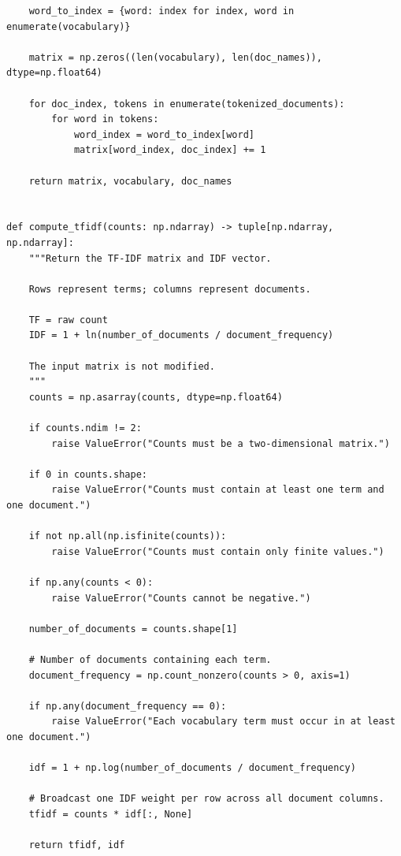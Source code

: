 \documentclass[12pt,a4paper]{report}
\theoremstyle{plain}
\theoremstyle{definition}
\theoremstyle{remark}
\theoremstyle{definition}
\begin{document}
\begin{lstlisting}
    word_to_index = {word: index for index, word in enumerate(vocabulary)}

    matrix = np.zeros((len(vocabulary), len(doc_names)), dtype=np.float64)

    for doc_index, tokens in enumerate(tokenized_documents):
        for word in tokens:
            word_index = word_to_index[word]
            matrix[word_index, doc_index] += 1

    return matrix, vocabulary, doc_names


def compute_tfidf(counts: np.ndarray) -> tuple[np.ndarray, np.ndarray]:
    """Return the TF-IDF matrix and IDF vector.

    Rows represent terms; columns represent documents.

    TF = raw count
    IDF = 1 + ln(number_of_documents / document_frequency)

    The input matrix is not modified.
    """
    counts = np.asarray(counts, dtype=np.float64)

    if counts.ndim != 2:
        raise ValueError("Counts must be a two-dimensional matrix.")

    if 0 in counts.shape:
        raise ValueError("Counts must contain at least one term and one document.")

    if not np.all(np.isfinite(counts)):
        raise ValueError("Counts must contain only finite values.")

    if np.any(counts < 0):
        raise ValueError("Counts cannot be negative.")

    number_of_documents = counts.shape[1]

    # Number of documents containing each term.
    document_frequency = np.count_nonzero(counts > 0, axis=1)

    if np.any(document_frequency == 0):
        raise ValueError("Each vocabulary term must occur in at least one document.")

    idf = 1 + np.log(number_of_documents / document_frequency)

    # Broadcast one IDF weight per row across all document columns.
    tfidf = counts * idf[:, None]

    return tfidf, idf
\end{lstlisting}
\end{document}
